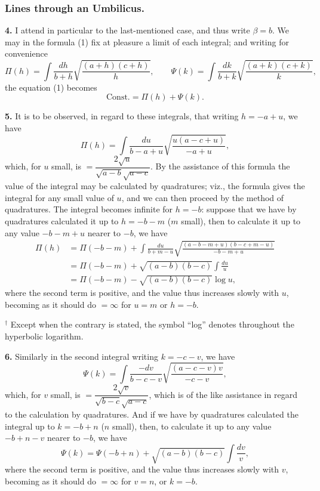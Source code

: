 \documentclass[11pt,a4paper]{article}
\begin{document}
\subsubsection*{Lines through an Umbilicus.}

\noindent\textbf{4.} I attend in particular to the last-mentioned case, and thus write $\beta = b$. We may in the formula (1) fix at pleasure a limit of each integral; and writing for convenience
\[
\Pi(h) = \int \frac{dh}{b+h} \sqrt{\frac{(a+h)(c+h)}{h}}, \qquad \Psi(k) = \int \frac{dk}{b+k} \sqrt{\frac{(a+k)(c+k)}{k}},
\]
the equation (1) becomes
\[
\text{Const.} = \Pi(h) + \Psi(k).
\]

\noindent\textbf{5.} It is to be observed, in regard to these integrals, that writing $h = -a + u$, we have
\[
\Pi(h) = \int \frac{du}{b-a+u} \sqrt{\frac{u(a-c+u)}{-a+u}},
\]
which, for $u$ small, is $= \dfrac{2\sqrt{u}}{\sqrt{a-b}\sqrt{a-c}}$. By the assistance of this formula the value of the integral may be calculated by quadratures; viz., the formula gives the integral for any small value of $u$, and we can then proceed by the method of quadratures. The integral becomes infinite for $h = -b$: suppose that we have by quadratures calculated it up to $h = -b - m$ ($m$ small), then to calculate it up to any value $-b - m + u$ nearer to $-b$, we have
\begin{align*}
\Pi(h) &= \Pi(-b-m) + \int \frac{du}{b+m-u} \sqrt{\frac{(a-b-m+u)(b-c+m-u)}{-b-m+u}} \\
&= \Pi(-b-m) + \sqrt{(a-b)(b-c)} \int \frac{du}{u} \\
&= \Pi(-b-m) - \sqrt{(a-b)(b-c)} \log u,
\end{align*}
where the second term is positive, and the value thus increases slowly with $u$, becoming as it should do $= \infty$ for $u = m$ or $h = -b$.

$^{\dagger}$ Except when the contrary is stated, the symbol ``log'' denotes throughout the hyperbolic logarithm.

\noindent\textbf{6.} Similarly in the second integral writing $k = -c - v$, we have
\[
\Psi(k) = \int \frac{-dv}{b-c-v} \sqrt{\frac{(a-c-v)v}{-c-v}},
\]
which, for $v$ small, is $= \dfrac{2\sqrt{v}}{\sqrt{b-c}\sqrt{a-c}}$, which is of the like assistance in regard to the calculation by quadratures. And if we have by quadratures calculated the integral up to $k = -b + n$ ($n$ small), then, to calculate it up to any value $-b + n - v$ nearer to $-b$, we have
\[
\Psi(k) = \Psi(-b+n) + \sqrt{(a-b)(b-c)} \int \frac{dv}{v},
\]
where the second term is positive, and the value thus increases slowly with $v$, becoming as it should do $= \infty$ for $v = n$, or $k = -b$.
\end{document}
